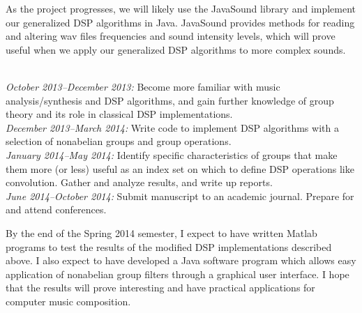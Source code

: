 \documentclass[10pt]{article}
\begin{document}
As the project progresses, we will likely use the JavaSound library and
implement our generalized DSP algorithms in Java.  JavaSound provides methods
for reading and altering wav files frequencies and sound intensity levels, which
will prove useful when we apply our generalized DSP algorithms to more complex
sounds.

\vskip5mm

\\
{\it October 2013--December 2013:} Become more familiar with music
analysis/synthesis and DSP algorithms, and gain further knowledge of group
theory and its role in classical DSP implementations. 
\\[5pt]
{\it December 2013--March 2014:} Write code to implement DSP algorithms with a
selection of nonabelian groups and group operations.  
\\[5pt]
{\it January 2014--May 2014:} 
Identify specific characteristics of groups that make them more (or less)
useful as an index set on which to define DSP operations like convolution.
Gather and analyze results, and write up reports.  
\\[5pt]
{\it June 2014--October 2014:} Submit manuscript to an academic journal.  Prepare
for and attend conferences.

\vskip5mm

By the end of the Spring 2014 semester, I expect to have written Matlab programs
to test the results of the modified DSP implementations described above.  I also
expect to have developed a Java software program which allows easy application
of nonabelian group filters through a graphical user interface.  I hope that the
results will prove interesting and have practical applications for computer
music composition.  
\end{document}
